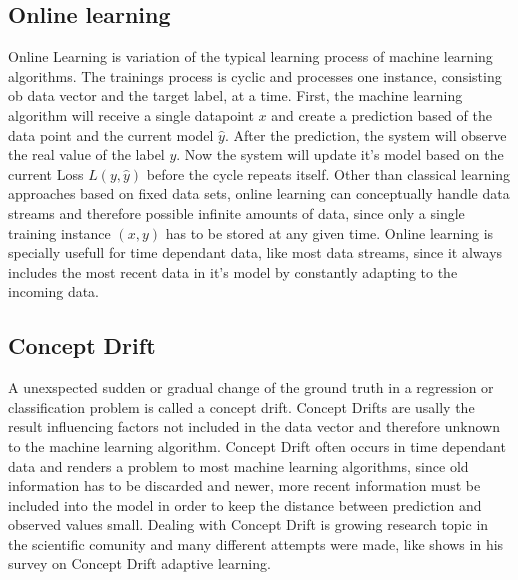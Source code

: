 \documentclass[a4paper,pt12]{article}
\begin{document}
\subsection{Online learning}
Online Learning is variation of the typical learning process of machine learning algorithms. The trainings process is cyclic and processes one instance, consisting ob data vector and the target label, at a time. \newline
First, the machine learning algorithm will receive a single datapoint $x$ and create a prediction based of the data point and the current model $\hat{y}$. After the prediction, the system will observe the real value of the label $y$. Now the system will update it's model based on the current Loss $L(y,\hat{y})$ before the cycle repeats itself. \newline
Other than classical learning approaches based on fixed data sets, online learning can conceptually handle data streams and therefore possible infinite amounts of data, since only a single training instance $(x,y)$ has to be stored at any given time. \newline
Online learning is specially usefull for time dependant data, like most data streams, since it always includes the most recent data in it's model by constantly adapting to the incoming data.

\subsection{Concept Drift}
A unexspected sudden or gradual change of the ground truth in a regression or classification problem is called a concept drift. Concept Drifts are usally the result influencing factors not included in the data vector and therefore unknown to the machine learning algorithm. Concept Drift often occurs in time dependant data and renders a problem to most machine learning algorithms, since old information has to be discarded and newer, more recent information must be included into the model in order to keep the distance between prediction and observed values small. Dealing with Concept Drift is growing research topic in the scientific comunity and many different attempts were made, like \cite{survey} shows in his survey on Concept Drift adaptive learning.
\end{document}
